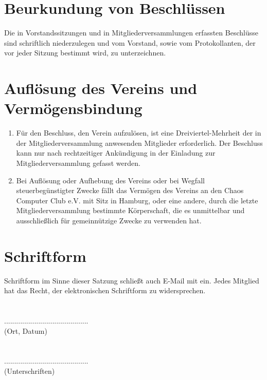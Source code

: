 \documentclass[a4paper,11pt]{scrartcl}
\begin{document}
\section{Beurkundung von Beschlüssen}
Die in Vorstandssitzungen und in Mitgliederversammlungen erfassten Beschlüsse 
sind schriftlich niederzulegen und vom Vorstand, sowie vom Protokollanten, der 
vor jeder Sitzung bestimmt wird, zu unterzeichnen.

\section{Auflösung des Vereins und Vermögensbindung}

\begin{enumerate}
\item Für den Beschluss, den Verein aufzulösen, ist eine Dreiviertel-Mehrheit 
  der in der Mitgliederversammlung anwesenden Mitglieder erforderlich. Der 
  Beschluss kann nur nach rechtzeitiger Ankündigung in der Einladung zur 
  Mitgliederversammlung gefasst werden.
\item Bei Auflösung oder Aufhebung des Vereins oder bei Wegfall 
  steuerbegünstigter Zwecke fällt das Vermögen des Vereins an den Chaos 
  Computer Club e.V. mit Sitz in Hamburg, oder eine andere, durch die letzte 
  Mitgliederversammlung bestimmte Körperschaft, die es unmittelbar und 
  ausschließlich für gemeinnützige Zwecke zu verwenden hat.
\end{enumerate}

\section{Schriftform}
Schriftform im Sinne dieser Satzung schließt auch E-Mail mit ein. Jedes 
Mitglied hat das Recht, der elektronischen Schriftform zu widersprechen.
\\
\\
\\
..........................................\\
(Ort, Datum)
\\
\\
\\
..........................................\\
(Unterschriften)
\end{document}
